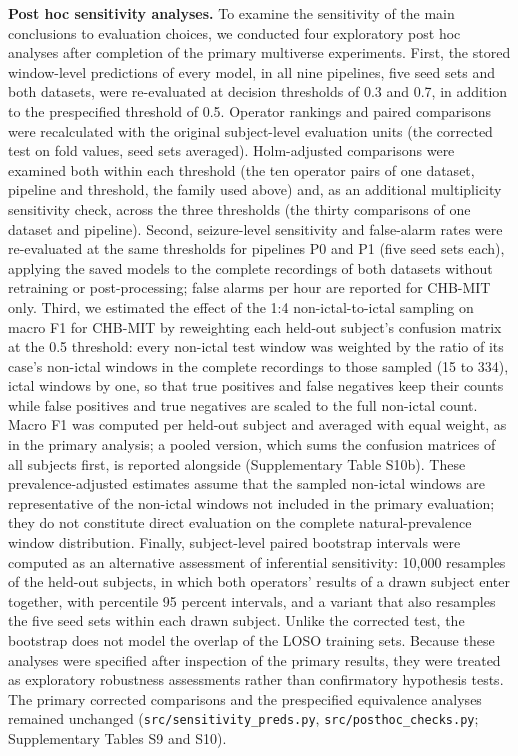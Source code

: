 \documentclass[11pt,a4paper]{article}
\begin{document}
\textbf{Post hoc sensitivity analyses.} To examine the sensitivity of the main conclusions to
evaluation choices, we conducted four exploratory post hoc analyses after completion of
the primary multiverse experiments. First, the stored window-level predictions of every
model, in all nine pipelines, five seed sets and both datasets, were re-evaluated at
decision thresholds of 0.3 and 0.7, in addition to the prespecified threshold of 0.5.
Operator rankings and paired comparisons were recalculated with the original
subject-level evaluation units (the corrected test on fold values, seed sets averaged).
Holm-adjusted comparisons were examined both within each threshold (the ten operator
pairs of one dataset, pipeline and threshold, the family used above) and, as an
additional multiplicity sensitivity check, across the three thresholds (the thirty
comparisons of one dataset and pipeline). Second, seizure-level sensitivity and
false-alarm rates were re-evaluated at the same thresholds for pipelines P0 and P1 (five
seed sets each), applying the saved models to the complete recordings of both datasets
without retraining or post-processing; false alarms per hour are reported for CHB-MIT
only. Third, we estimated the effect of the 1:4 non-ictal-to-ictal sampling on macro F1
for CHB-MIT by reweighting each held-out subject's confusion matrix at the 0.5
threshold: every non-ictal test window was weighted by the ratio of its case's non-ictal
windows in the complete recordings to those sampled (15 to 334), ictal windows by one,
so that true positives and false negatives keep their counts while false positives and
true negatives are scaled to the full non-ictal count. Macro F1 was computed per
held-out subject and averaged with equal weight, as in the primary analysis; a pooled
version, which sums the confusion matrices of all subjects first, is reported alongside
(Supplementary Table S10b). These prevalence-adjusted estimates assume that the sampled
non-ictal windows are representative of the non-ictal windows not included in the
primary evaluation; they do not constitute direct evaluation on the complete
natural-prevalence window distribution. Finally, subject-level paired bootstrap
intervals were computed as an alternative assessment of inferential sensitivity: 10,000
resamples of the held-out subjects, in which both operators' results of a drawn subject
enter together, with percentile 95 percent intervals, and a variant that also resamples
the five seed sets within each drawn subject. Unlike the corrected test, the bootstrap
does not model the overlap of the LOSO training sets. Because these analyses were
specified after inspection of the primary results, they were treated as exploratory
robustness assessments rather than confirmatory hypothesis tests. The primary corrected
comparisons and the prespecified equivalence analyses remained unchanged
(\nolinkurl{src/sensitivity_preds.py}, \nolinkurl{src/posthoc_checks.py}; Supplementary Tables S9 and S10).
\end{document}
